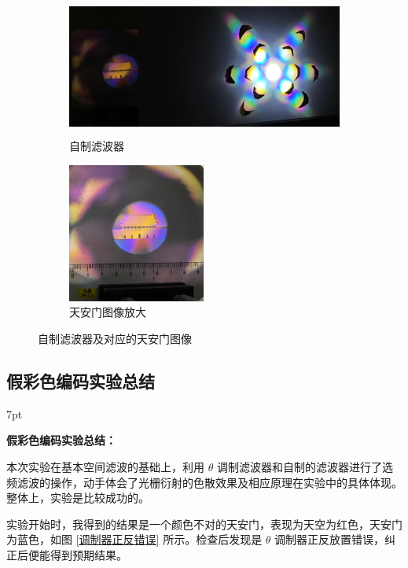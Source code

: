 \documentclass[UTF8]{article}
\theoremstyle{MyLineTheoremStyle} %
\theoremstyle{MyBlockTheoremStyle} %
\theoremstyle{MySubsubsectionStyle} %
\newenvironment{graybox}{%
        \def\FrameCommand{%
        \hspace{1pt}%
        {\color{gray}\vrule width 2pt}%
        {\color{graybox_color}\vrule width 4pt}%
        \colorbox{graybox_color}%
        }%
        \MakeFramed{\advance\hsize-\width\FrameRestore}%
        \noindent\hspace{-4.55pt}%
        \begin{adjustwidth}{}{7pt}%
        \vspace{2pt}\vspace{2pt}%
        }
        {%
        \vspace{2pt}\end{adjustwidth}\endMakeFramed%
        }
\begin{document}
\begin{figure}[H]\centering
\begin{subfigure}[b]{0.66\columnwidth}\centering
    \includegraphics[height=130pt]{assets/3 假彩编码/自制滤波器 天安门暗.jpg}
    \caption{自制滤波器}
\end{subfigure}\hfill
\begin{subfigure}[b]{0.33\columnwidth}\centering
    \includegraphics[height=130pt]{assets/3 假彩编码/天安门 自制 暗.jpg}
    \caption{天安门图像放大}
\end{subfigure}
\caption{自制滤波器及对应的天安门图像}
\end{figure}

\vspace*{-7mm}
\subsection{假彩色编码实验总结}
\vspace*{-5mm}
\begin{graybox}
\textbf{假彩色编码实验总结：}

本次实验在基本空间滤波的基础上，利用 $\theta$ 调制滤波器和自制的滤波器进行了选频滤波的操作，动手体会了光栅衍射的色散效果及相应原理在实验中的具体体现。整体上，实验是比较成功的。

实验开始时，我得到的结果是一个颜色不对的天安门，表现为天空为红色，天安门为蓝色，如图 \ref{调制器正反错误} 所示。检查后发现是 $\theta$ 调制器正反放置错误，纠正后便能得到预期结果。
\end{graybox}
\end{document}
